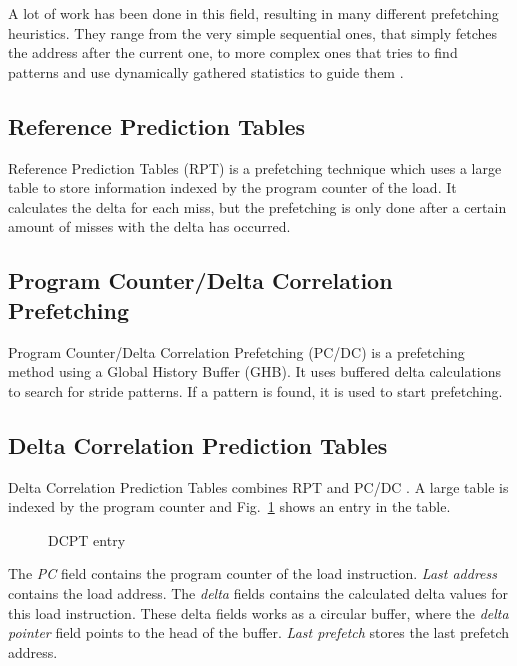 A lot of work has been done in this field, resulting in many different prefetching heuristics. They
range from the very simple sequential ones, that simply fetches the address after the current one,
to more complex ones that tries to find patterns and use dynamically gathered statistics to guide
them \cite{prefetch_range}.

\subsection{Reference Prediction Tables}
Reference Prediction Tables (RPT) \cite{rpt} is a prefetching technique which uses a large table to
store information indexed by the program counter of the load. It calculates the delta for each miss,
but the prefetching is only done after a certain amount of misses with the delta has occurred.

\subsection{Program Counter/Delta Correlation Prefetching}
Program Counter/Delta Correlation Prefetching (PC/DC) \cite{prefetch_range} is a prefetching method
using a Global History Buffer (GHB). It uses buffered delta calculations to search for stride
patterns. If a pattern is found, it is used to start prefetching.

\subsection{Delta Correlation Prediction Tables} 
Delta Correlation Prediction Tables combines RPT and PC/DC \cite{dcpt}. A large table is indexed by the program counter and Fig.~\ref{fig:dcpt_entry} shows an
entry in the table.
\begin{figure}[h]
	\begin{center}
	\end{center}
	\caption{DCPT entry\label{fig:dcpt_entry}}
\end{figure}
The \emph{PC} field contains the program counter of the load instruction. \emph{Last address}
contains the load address. The \emph{delta} fields contains the calculated delta values for this
load instruction. These delta fields works as a circular buffer, where the \emph{delta pointer}
field points to the head of the buffer. \emph{Last prefetch} stores the last prefetch address. 

